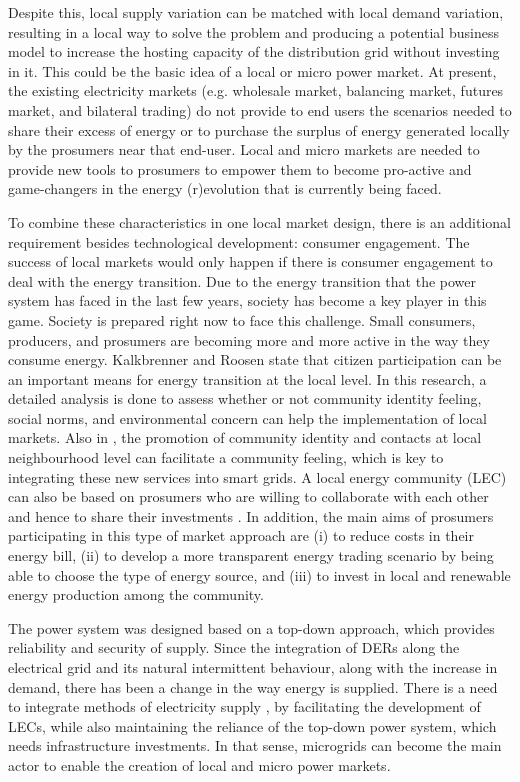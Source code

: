 Despite this, local supply variation can be matched with local demand variation, resulting in a local way to solve the problem \cite{mengelkamp2018designing} and producing a potential business model to increase the hosting capacity of the distribution grid without investing in it. This could be the basic idea of a local or micro power market. At present, the existing electricity markets (e.g. wholesale market, balancing market, futures market, and bilateral trading) do not provide to end users the scenarios needed to share their excess of energy or to purchase the surplus of  energy generated locally by the prosumers near that end-user. Local and micro markets are needed to provide new tools to prosumers to empower them to become pro-active and game-changers in the energy (r)evolution that is currently being faced. 

To combine these characteristics in one local market design, there is an additional requirement besides technological development: consumer engagement. The success of local markets would only happen if there is consumer engagement to deal with the energy transition. Due to the energy transition that the power system has faced in the last few years, society has become a key player in this game. Society is prepared right now to face this challenge. Small consumers, producers, and prosumers are becoming more and more active in the way they consume energy. Kalkbrenner and Roosen \cite{kalkbrenner2016citizens} state that citizen participation can be an important means for energy transition at the local level. In this research, a detailed analysis is done to assess whether or not community identity feeling, social norms, and environmental concern can help the implementation of local markets. Also in \cite{kalkbrenner2016citizens}, the promotion of community identity and contacts at local neighbourhood level can facilitate a community feeling, which is key to integrating these new services into smart grids. A local energy community (LEC) can also be based on prosumers who are willing to collaborate with each other and hence to share their investments \cite{sousa2018peer}. In addition, the main aims of prosumers participating in this type of market approach are (i) to reduce costs in their energy bill, (ii) to develop a more transparent energy trading scenario by being able to choose the type of energy source, and (iii) to invest in local and renewable energy production among the community.

The power system was designed based on a top-down approach, which provides reliability and security of supply. Since the integration of DERs along the electrical grid and its natural intermittent behaviour, along with the increase in demand, there has been a change in the way energy is supplied. There is a need to integrate methods of electricity supply \cite{peng2017electricity}, by facilitating the development of LECs, while also maintaining the reliance of the top-down power system, which needs infrastructure investments. In that sense, microgrids can become the main actor to enable the creation of local and micro power markets. 

